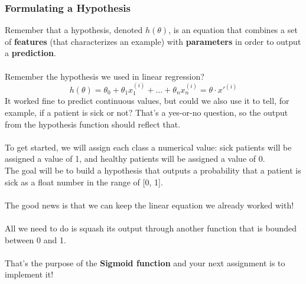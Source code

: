 \subsubsection*{Formulating a Hypothesis}
Remember that a hypothesis, denoted $h(\theta)$, is an equation that combines a set of \textbf{features} (that characterizes an example) with \textbf{parameters} in order to output a \textbf{prediction}.\\
\\
Remember the hypothesis we used in linear regression?\\
$$
h(\theta) = \theta_0 + \theta_{1} x_{1}^{(i)} + \dots + \theta_{n} x_{n}^{(i)} = \theta \cdot x'^{(i)}
$$
\newline
It worked fine to predict continuous values, but could we also use it to tell, for example, 
if a patient is sick or not?
That's a yes-or-no question, so the output from the hypothesis function should reflect that.\\
\\
To get started, we will assign each class a numerical value: sick patients will be 
assigned a value of 1, and healthy patients will be assigned a value of 0.\\
The goal will be to build a hypothesis that outputs a probability that a patient is sick as a float number in the range of [0, 1].\\
\\
The good news is that we can keep the linear equation we already worked with!\\
\\
All we need to do is squash its output through another function that is bounded between 0 and 1.\\
\\
That's the purpose of the \textbf{Sigmoid function} and your next assignment is to implement it!
